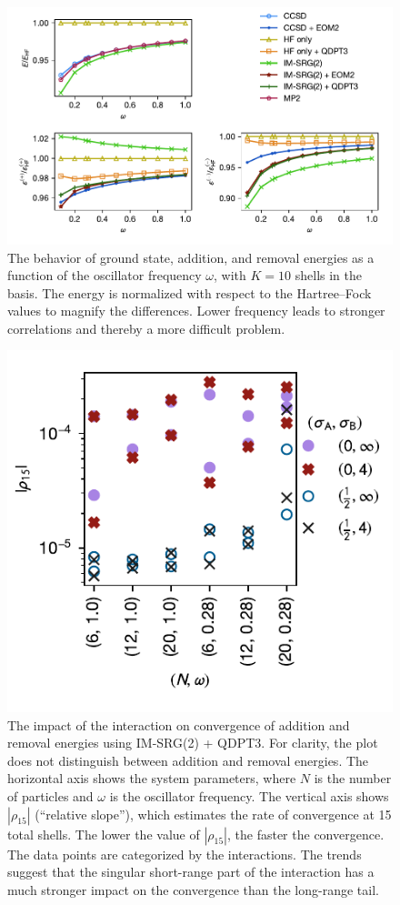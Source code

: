 \begin{figure}
  \centering
  \includegraphics{fig-by-freq-10-6-normal.pdf}
  \caption{The behavior of ground state, addition, and removal energies as a function of the oscillator frequency $\omega$, with $K = 10$ shells in the basis.  The energy is normalized with respect to the Hartree--Fock values to magnify the differences.  Lower frequency leads to stronger correlations and thereby a more difficult problem.}
  \label{fig:by-freq-10-6-normal}
\end{figure}

\begin{figure}
  \centering
  \includegraphics{fig-rel-slopes2.pdf}
  \caption{The impact of the interaction on convergence of addition and removal energies using IM-SRG(2) + QDPT3.  For clarity, the plot does not distinguish between addition and removal energies.  The horizontal axis shows the system parameters, where $N$ is the number of particles and $\omega$ is the oscillator frequency.  The vertical axis shows $|\rho_{15}|$ (``relative slope''), which estimates the rate of convergence at 15 total shells.  The lower the value of $|\rho_{15}|$, the faster the convergence.  The data points are categorized by the interactions.  The trends suggest that the singular short-range part of the interaction has a much stronger impact on the convergence than the long-range tail.}
  \label{fig:rel-slopes}
\end{figure}

